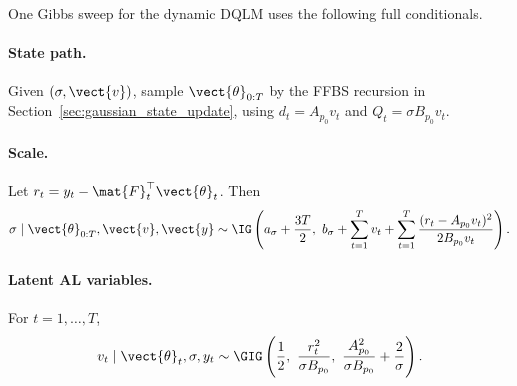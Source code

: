 One Gibbs sweep for the dynamic DQLM uses the following full conditionals.

\paragraph{State path.}
Given $(\sigma,\vect{v})$, sample $\vect{\theta}_{0:T}$ by the FFBS recursion
in Section~\ref{sec:gaussian_state_update}, using
$d_t=A_{p_0}v_t$ and $Q_t=\sigma B_{p_0}v_t$.

\paragraph{Scale.}
Let $r_t=y_t-\mat{F}_t^\top\vect{\theta}_t$. Then
\begin{equation}
\sigma\mid \vect{\theta}_{0:T},\vect{v},\vect{y}
\sim \IG\left(
a_\sigma+\frac{3T}{2},\
b_\sigma+\sum_{t=1}^T v_t+
\sum_{t=1}^T\frac{(r_t-A_{p_0}v_t)^2}{2B_{p_0}v_t}
\right).
\label{eq:dyn_dqlm_sigma_cond}
\end{equation}

\paragraph{Latent AL variables.}
For $t=1,\ldots,T$,
\begin{equation}
v_t\mid\vect{\theta}_t,\sigma,y_t
\sim
\GIG\left(
\frac{1}{2},\
\frac{r_t^2}{\sigma B_{p_0}},\
\frac{A_{p_0}^2}{\sigma B_{p_0}}+\frac{2}{\sigma}
\right).
\label{eq:dyn_dqlm_v_cond}
\end{equation}

